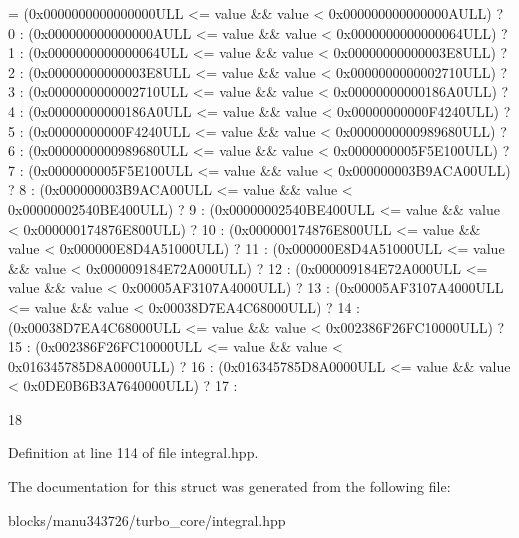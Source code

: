 \begin{DoxyCode}
= (0x0000000000000000ULL <= value && value < 0x000000000000000AULL) ? 0 :  
                                       (0x000000000000000AULL <= value && value < 0x0000000000000064ULL) ? 
      1 :  
                                       (0x0000000000000064ULL <= value && value < 0x00000000000003E8ULL) ? 
      2 :  
                                       (0x00000000000003E8ULL <= value && value < 0x0000000000002710ULL) ? 
      3 :  
                                       (0x0000000000002710ULL <= value && value < 0x00000000000186A0ULL) ? 
      4 :  
                                       (0x00000000000186A0ULL <= value && value < 0x00000000000F4240ULL) ? 
      5 :  
                                       (0x00000000000F4240ULL <= value && value < 0x0000000000989680ULL) ? 
      6 :  
                                       (0x0000000000989680ULL <= value && value < 0x0000000005F5E100ULL) ? 
      7 :  
                                       (0x0000000005F5E100ULL <= value && value < 0x000000003B9ACA00ULL) ? 
      8 :  
                                       (0x000000003B9ACA00ULL <= value && value < 0x00000002540BE400ULL) ? 
      9 :  
                                       (0x00000002540BE400ULL <= value && value < 0x000000174876E800ULL) ? 
      10 : 
                                       (0x000000174876E800ULL <= value && value < 0x000000E8D4A51000ULL) ? 
      11 : 
                                       (0x000000E8D4A51000ULL <= value && value < 0x000009184E72A000ULL) ? 
      12 : 
                                       (0x000009184E72A000ULL <= value && value < 0x00005AF3107A4000ULL) ? 
      13 : 
                                       (0x00005AF3107A4000ULL <= value && value < 0x00038D7EA4C68000ULL) ? 
      14 : 
                                       (0x00038D7EA4C68000ULL <= value && value < 0x002386F26FC10000ULL) ? 
      15 : 
                                       (0x002386F26FC10000ULL <= value && value < 0x016345785D8A0000ULL) ? 
      16 : 
                                       (0x016345785D8A0000ULL <= value && value < 0x0DE0B6B3A7640000ULL) ? 
      17 : 
                                                                                                           
      18
\end{DoxyCode}


Definition at line 114 of file integral.\+hpp.



The documentation for this struct was generated from the following file\+:\begin{DoxyCompactItemize}
\item 
blocks/manu343726/turbo\+\_\+core/integral.\+hpp\end{DoxyCompactItemize}
